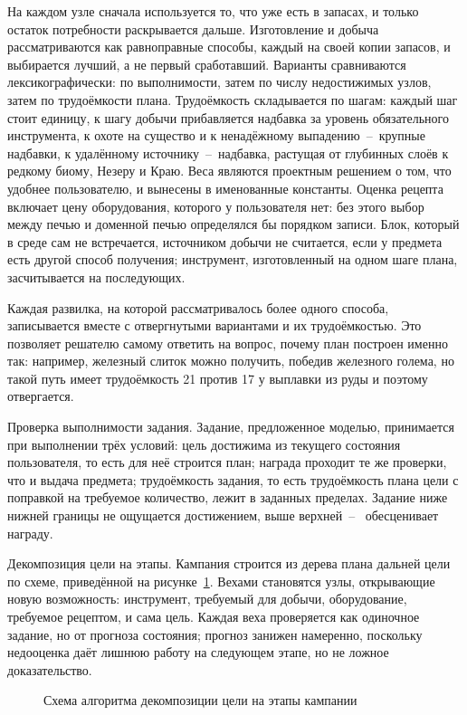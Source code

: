 На каждом узле сначала используется то, что уже есть в запасах, и только остаток
потребности раскрывается дальше. Изготовление и добыча рассматриваются как равноправные
способы, каждый на своей копии запасов, и выбирается лучший, а не первый сработавший.
Варианты сравниваются лексикографически: по выполнимости, затем по числу недостижимых
узлов, затем по трудоёмкости плана. Трудоёмкость складывается по шагам: каждый шаг
стоит единицу, к шагу добычи прибавляется надбавка за уровень обязательного инструмента,
к охоте на существо и к ненадёжному выпадению~--~крупные надбавки, к удалённому
источнику~--~надбавка, растущая от глубинных слоёв к редкому биому, Незеру и Краю.
Веса являются проектным решением о том, что удобнее пользователю, и вынесены в
именованные константы. Оценка рецепта включает цену оборудования, которого у
пользователя нет: без этого выбор между печью и доменной печью определялся бы порядком
записи. Блок, который в среде сам не встречается, источником добычи не считается, если у
предмета есть другой способ получения; инструмент, изготовленный на одном шаге плана,
засчитывается на последующих.

Каждая развилка, на которой рассматривалось более одного способа, записывается вместе с
отвергнутыми вариантами и их трудоёмкостью. Это позволяет решателю самому ответить на
вопрос, почему план построен именно так: например, железный слиток можно получить,
победив железного голема, но такой путь имеет трудоёмкость 21 против 17 у выплавки из
руды и поэтому отвергается.

Проверка выполнимости задания. Задание, предложенное моделью, принимается при
выполнении трёх условий: цель достижима из текущего состояния пользователя, то есть для
неё строится план; награда проходит те же проверки, что и выдача предмета; трудоёмкость
задания, то есть трудоёмкость плана цели с поправкой на требуемое количество, лежит в
заданных пределах. Задание ниже нижней границы не ощущается достижением, выше верхней~--~
обесценивает награду.

Декомпозиция цели на этапы. Кампания строится из дерева плана дальней цели по
схеме, приведённой на рисунке~\ref{fig:campaign}. Вехами становятся узлы, открывающие
новую возможность: инструмент, требуемый для добычи, оборудование, требуемое рецептом,
и сама цель. Каждая веха проверяется как одиночное задание, но от прогноза состояния;
прогноз занижен намеренно, поскольку недооценка даёт лишнюю работу на следующем этапе, но
не ложное доказательство.

\begin{figure}[!htb]
  \centering
  
  \caption{Схема алгоритма декомпозиции цели на этапы кампании}
  \label{fig:campaign}
\end{figure}

